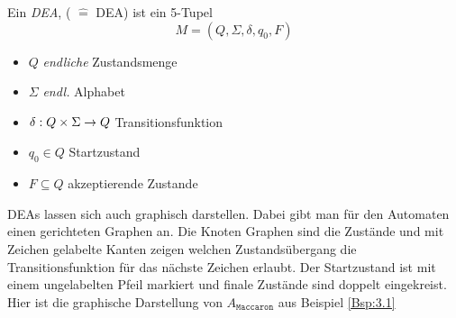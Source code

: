 \begin{Def}
	Ein \emph{\acf{DEA}}, ( $\hat=$ \acl{DEA}) ist ein 5-Tupel
	\[ M= (Q,\Sigma,\delta,q_0,F) \]
	\begin{itemize}
		\item $Q$ \emph{endliche} Zustandsmenge
		\item $\Sigma$ \emph{endl.} Alphabet
		\item $\delta:Q\x\Sigma\->Q$ Transitionsfunktion
		\item $q_0\in Q$ Startzustand
		\item $F\subseteq Q$ akzeptierende Zustande
	\end{itemize}
\end{Def}

DEAs lassen sich auch graphisch darstellen.
Dabei gibt man für den Automaten einen gerichteten Graphen an.
Die Knoten Graphen sind die Zustände und mit Zeichen gelabelte Kanten zeigen welchen Zustandsübergang die Transitionsfunktion für das nächste Zeichen erlaubt.
Der Startzustand ist mit einem ungelabelten Pfeil markiert und finale Zustände sind doppelt eingekreist.
Hier ist die graphische Darstellung von $A_{\mathtt{Maccaron}}$ aus Beispiel \ref{Bsp:3.1}

\begin{center}
\end{center}

